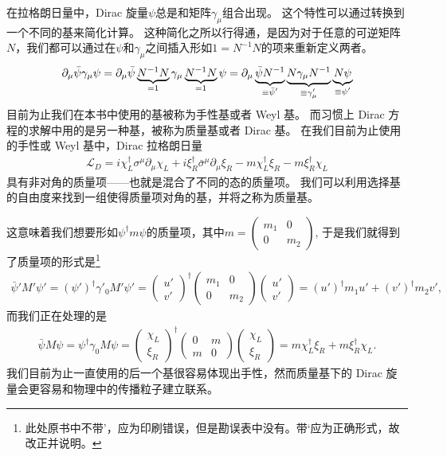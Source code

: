 在拉格朗日量中，Dirac 旋量$\psi$总是和矩阵$\gamma_\mu$组合出现。
这个特性可以通过转换到一个不同的基来简化计算。
这种简化之所以行得通，是因为对于任意的可逆矩阵$N$，我们都可以通过在$\psi$和$\gamma_\mu$之间插入形如$1=N^{-1}N$的项来重新定义两者。
\begin{align}
  \partial_\mu\bar{\psi}\gamma_\mu\psi = \partial_\mu\bar{\psi}\underbrace{N^{-1}N}_{\mathclap{=1}}\gamma_\mu\underbrace{N^{-1}N}_{\mathclap{=1}}\psi = \partial_\mu\underbrace{\bar{\psi}N^{-1}}_{\mathclap{\equiv\bar{\psi}'}}\underbrace{N\gamma_\mu N^{-1}}_{\mathclap{\equiv\gamma'_\mu}}\underbrace{N\psi}_{\mathclap{\equiv\psi'}}
\end{align}
目前为止我们在本书中使用的基被称为手性基或者 Weyl 基。
而习惯上 Dirac 方程的求解中用的是另一种基，被称为质量基或者 Dirac 基。
在我们目前为止使用的手性或 Weyl 基中，Dirac 拉格朗日量
\begin{align}
  \mathcal{L}_D=i\chi_L^\dagger\sigma^\mu\partial_\mu \chi_L+i\xi_R^\dagger\bar{\sigma}^\mu\partial_\mu \xi_R-m\chi_L^\dagger\xi_R-m\xi_R^\dagger\chi_L
\end{align}
具有非对角的质量项——也就是混合了不同的态的质量项。
我们可以利用选择基的自由度来找到一组使得质量项对角的基，并将之称为质量基。

这意味着我们想要形如$\psi^\dagger m\psi$的质量项，其中$m=\begin{pmatrix}m_1&0\\0&m_2\end{pmatrix}$,
于是我们就得到了质量项的形式是\footnote{此处原书中不带'，应为印刷错误，但是勘误表中没有。带‘应为正确形式，故改正并说明。}
\begin{align}
  \bar{\psi}'M'\psi'=(\psi')^\dagger
  \gamma'_0M'\psi'=\begin{pmatrix}u'\\v'\end{pmatrix}^\dagger\begin{pmatrix}m_1&0\\0&m_2\end{pmatrix}
  \begin{pmatrix}u'\\v'\end{pmatrix}=(u')^\dagger m_1u'+(v')^\dagger m_2v',
\end{align}
而我们正在处理的是
\begin{align}
  \bar{\psi}M\psi=\psi^\dagger\gamma_0M\psi=\begin{pmatrix}\chi_L\\\xi_R\end{pmatrix}^\dagger\begin{pmatrix}0&m\\m&0\end{pmatrix}
  \begin{pmatrix}\chi_L\\\xi_R\end{pmatrix}=m\chi_L^\dagger\xi_R+m\xi_R^\dagger\chi_L.
\end{align}
我们目前为止一直使用的后一个基很容易体现出手性，然而质量基下的 Dirac 旋量会更容易和物理中的传播粒子建立联系。

